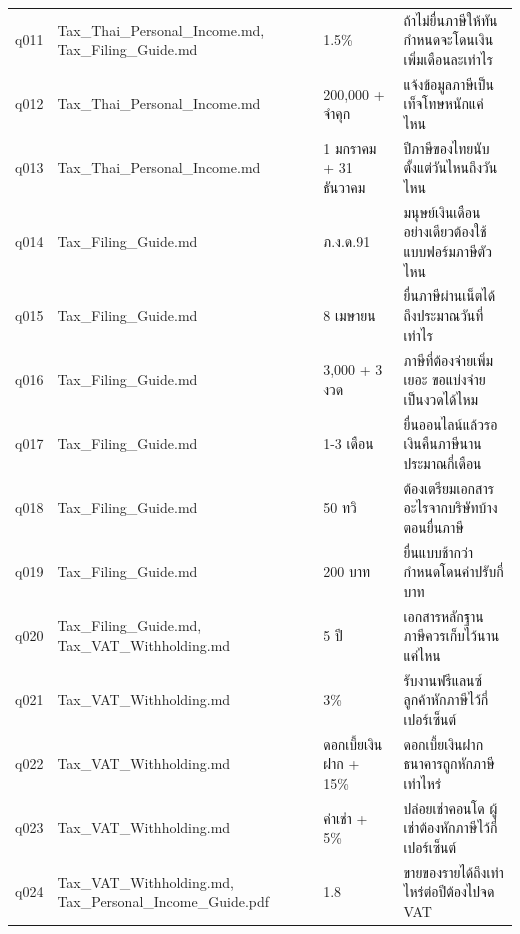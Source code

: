 \documentclass[11pt,a4paper]{article}
\begin{document}
{\begin{longtable}{lp{3.6cm}p{3.4cm}p{6.3cm}}
q011 & Tax\_\allowbreak{}Thai\_\allowbreak{}Personal\_\allowbreak{}Income.md, Tax\_\allowbreak{}Filing\_\allowbreak{}Guide.md & 1.5\% & {\thaifont ถ้าไม่ยื่นภาษีให้ทันกำหนดจะโดนเงินเพิ่มเดือนละเท่าไร} \\
q012 & Tax\_\allowbreak{}Thai\_\allowbreak{}Personal\_\allowbreak{}Income.md & 200,000 + {\thaifont จำคุก} & {\thaifont แจ้งข้อมูลภาษีเป็นเท็จโทษหนักแค่ไหน} \\
q013 & Tax\_\allowbreak{}Thai\_\allowbreak{}Personal\_\allowbreak{}Income.md & 1 {\thaifont มกราคม }+ 31 {\thaifont ธันวาคม} & {\thaifont ปีภาษีของไทยนับตั้งแต่วันไหนถึงวันไหน} \\
q014 & Tax\_\allowbreak{}Filing\_\allowbreak{}Guide.md & {\thaifont ภ}.{\thaifont ง}.{\thaifont ด}.91 & {\thaifont มนุษย์เงินเดือนอย่างเดียวต้องใช้แบบฟอร์มภาษีตัวไหน} \\
q015 & Tax\_\allowbreak{}Filing\_\allowbreak{}Guide.md & 8 {\thaifont เมษายน} & {\thaifont ยื่นภาษีผ่านเน็ตได้ถึงประมาณวันที่เท่าไร} \\
q016 & Tax\_\allowbreak{}Filing\_\allowbreak{}Guide.md & 3,000 + 3 {\thaifont งวด} & {\thaifont ภาษีที่ต้องจ่ายเพิ่มเยอะ ขอแบ่งจ่ายเป็นงวดได้ไหม} \\
q017 & Tax\_\allowbreak{}Filing\_\allowbreak{}Guide.md & 1-3 {\thaifont เดือน} & {\thaifont ยื่นออนไลน์แล้วรอเงินคืนภาษีนานประมาณกี่เดือน} \\
q018 & Tax\_\allowbreak{}Filing\_\allowbreak{}Guide.md & 50 {\thaifont ทวิ} & {\thaifont ต้องเตรียมเอกสารอะไรจากบริษัทบ้างตอนยื่นภาษี} \\
q019 & Tax\_\allowbreak{}Filing\_\allowbreak{}Guide.md & 200 {\thaifont บาท} & {\thaifont ยื่นแบบช้ากว่ากำหนดโดนค่าปรับกี่บาท} \\
q020 & Tax\_\allowbreak{}Filing\_\allowbreak{}Guide.md, Tax\_\allowbreak{}VAT\_\allowbreak{}Withholding.md & 5 {\thaifont ปี} & {\thaifont เอกสารหลักฐานภาษีควรเก็บไว้นานแค่ไหน} \\
q021 & Tax\_\allowbreak{}VAT\_\allowbreak{}Withholding.md & 3\% & {\thaifont รับงานฟรีแลนซ์ ลูกค้าหักภาษีไว้กี่เปอร์เซ็นต์} \\
q022 & Tax\_\allowbreak{}VAT\_\allowbreak{}Withholding.md & {\thaifont ดอกเบี้ยเงินฝาก }+ 15\% & {\thaifont ดอกเบี้ยเงินฝากธนาคารถูกหักภาษีเท่าไหร่} \\
q023 & Tax\_\allowbreak{}VAT\_\allowbreak{}Withholding.md & {\thaifont ค่าเช่า }+ 5\% & {\thaifont ปล่อยเช่าคอนโด ผู้เช่าต้องหักภาษีไว้กี่เปอร์เซ็นต์} \\
q024 & Tax\_\allowbreak{}VAT\_\allowbreak{}Withholding.md, Tax\_\allowbreak{}Personal\_\allowbreak{}Income\_\allowbreak{}Guide.pdf & 1.8 & {\thaifont ขายของรายได้ถึงเท่าไหร่ต่อปีต้องไปจด }VAT \\

\end{longtable}}
\end{document}
